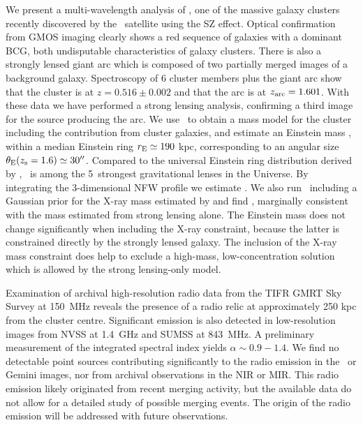 We present a multi-wavelength analysis of \plck, one of the massive galaxy clusters recently 
discovered by the \planck\ satellite using the SZ effect. Optical confirmation from GMOS imaging 
clearly shows a red sequence of galaxies with a dominant BCG, both undisputable characteristics of 
galaxy clusters. There is also a strongly lensed giant arc which is composed of two partially 
merged images of a background galaxy. Spectroscopy of 6 cluster members plus the giant arc show 
that the cluster is at $z=0.516\pm0.002$ and that the arc is at $z_{\rm arc}=1.601$. With these data 
we have performed a strong lensing analysis, confirming a third image for the source producing the 
arc. We use \lenstool\ to obtain a mass model for the cluster including the contribution from 
cluster galaxies, and estimate an Einstein mass \emass, within a median Einstein ring $r_{\rm E}\simeq190$ 
kpc, corresponding to an angular size $\theta_{\rm E}(z_{\rm s}=1.6)\simeq30''$. Compared to the universal 
Einstein ring distribution derived by \cite{zitrin12_sdss}, \plck\ is among the 5\percent\ strongest 
gravitational lenses in the Universe. By integrating the 3-dimensional NFW profile we estimate 
\mass. We also run \lenstool\ including a Gaussian prior for the X-ray mass estimated by 
\cite{planck11ix} and find \mslx, marginally consistent with the mass estimated from strong lensing 
alone. The Einstein mass does not change significantly when including the X-ray constraint, because 
the latter is constrained directly by the strongly lensed galaxy. The inclusion of the X-ray mass 
constraint does help to exclude a high-mass, low-concentration solution which is allowed by the 
strong lensing-only model.

Examination of archival high-resolution radio data from the TIFR GMRT Sky Survey at 150~MHz reveals 
the presence of a radio relic at approximately 250 kpc from the cluster centre. Significant emission 
is also detected in low-resolution images from NVSS at 1.4~GHz and SUMSS at 843~MHz. A preliminary 
measurement of the integrated spectral index yields $\alpha\sim0.9-1.4$. We find no detectable point 
sources contributing significantly to the radio emission in the \xmm\ or Gemini images, nor from 
archival observations in the NIR or MIR. This radio emission likely originated from recent 
merging activity, but the available data do not allow for a detailed study of possible merging 
events. The origin of the radio emission will be addressed with future observations.


